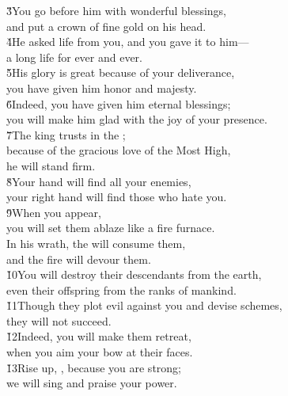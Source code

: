 \begin{poetry}
\poeml \v{3}You go before him with wonderful blessings, \\
\poemll    and put a crown of fine gold on his head. \\
\poeml \v{4}He asked life from you, and you gave it to him--- \\
\poemll    a long life for ever and ever. \\
\poeml \v{5}His glory is great because of your deliverance, \\
\poemll    you have given him honor and majesty. \\
\poeml \v{6}Indeed, you have given him eternal blessings; \\
\poemll    you will make him glad with the joy of your presence. \\
\poeml \v{7}The king trusts in the ; \\
\poemll    because of the gracious love of the Most High, \\
\poemlll       he will stand firm. \\
\poeml \v{8}Your hand will find all your enemies, \\
\poemll    your right hand will find those who hate you. \\
\poeml \v{9}When you appear, \\
\poemll    you will set them ablaze like a fire furnace. \\
\poeml In his wrath, the  will consume them, \\
\poemll    and the fire will devour them. \\
\poeml \v{10}You will destroy their descendants from the earth, \\
\poemll    even their offspring from the ranks of mankind. \\
\poeml \v{11}Though they plot evil against you and devise schemes, \\
\poemll    they will not succeed. \\
\poeml \v{12}Indeed, you will make them retreat, \\
\poemll    when you aim your bow at their faces. \\
\poeml \v{13}Rise up, , because you are strong; \\
\poemll    we will sing and praise your power.
\end{poetry}

